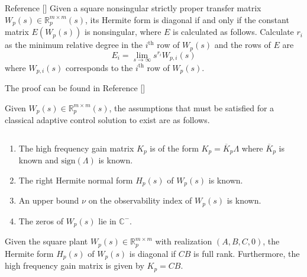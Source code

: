 \documentclass[]{../sty/aiaa-tc}
\begin{document}
  \begin{lem-dan}\label{lem.E}
    Reference []
    Given a square nonsingular strictly proper transfer matrix $W_{p}(s)\in\mathbb{R}_{p}^{m\times m}(s)$, its Hermite form is diagonal if and only if the constant matrix $E(W_{p}(s))$ is nonsingular, where $E$ is calculated as follows.
    Calculate $r_{i}$ as the minimum relative degree in the $i^{\text{th}}$ row of $W_{p}(s)$ and the rows of $E$ are
    \begin{equation}
      E_{i}=\lim_{s\rightarrow\infty}s^{r_{i}}W_{p,i}(s)
    \end{equation}
    where $W_{p,i}(s)$ corresponds to the $i^{\text{th}}$ row of $W_{p}(s)$.
  \end{lem-dan}

  \begin{proof-dan}
    The proof can be found in Reference []
  \end{proof-dan}

  Given $W_{p}(s)\in\mathbb{R}_{p}^{m\times m}(s)$, the assumptions that must be satisfied for a classical adaptive control solution to exist are as follows.\cite{narendra.stable.2005}

  \begin{ass-dan} $\;$\label{ass.classical}
    \begin{enumerate}[(\roman{enumi}), ref=\roman{enumi}]
      \itemsep0em
      \item{The high frequency gain matrix $K_{p}$ is of the form $K_{p}=\overline{K}_{p}\Lambda$ where $\overline{K}_{p}$ is known and $\text{sign}(\Lambda)$ is known.\label{ass.kp}}
      \item{The right Hermite normal form $H_{p}(s)$ of $W_{p}(s)$ is known.\label{ass.hermite}}
      \item{An upper bound $\nu$ on the observability index of $W_{p}(s)$ is known.\label{ass.nu}}
      \item{The zeros of $W_{p}(s)$ lie in $\mathbb{C}^{-}$.\label{ass.tzeroWp}}
    \end{enumerate}
  \end{ass-dan}

  \begin{thm-dan}\label{thm.CB}
    Given the square plant $W_{p}(s)\in\mathbb{R}_{p}^{m\times m}$ with realization $(A,B,C,0)$, the Hermite form $H_{p}(s)$ of $W_{p}(s)$ is diagonal if $CB$ is full rank.
    Furthermore, the high frequency gain matrix is given by $K_{p}=CB$.
  \end{thm-dan}
\end{document}
